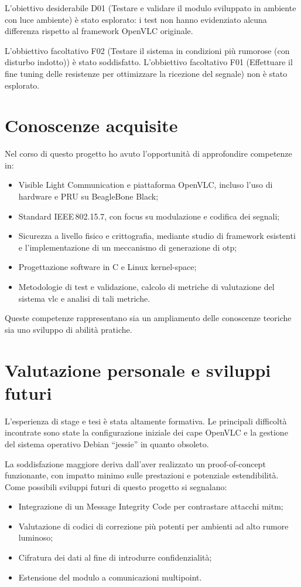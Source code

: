 L'obiettivo desiderabile D01 (Testare e validare il modulo sviluppato in ambiente con luce ambiente) è stato esplorato: i test non hanno evidenziato alcuna differenza rispetto al framework OpenVLC originale.

L'obbiettivo facoltativo F02 (Testare il sistema in condizioni più rumorose (con disturbo indotto)) è stato soddisfatto.
L'obbiettivo facoltativo F01 (Effettuare il fine tuning delle resistenze per ottimizzare la ricezione del segnale) non è stato esplorato.

\section{Conoscenze acquisite}
Nel corso di questo progetto ho avuto l'opportunità di approfondire competenze in:
\begin{itemize}
  \item Visible Light Communication e piattaforma OpenVLC, incluso l'uso di hardware e PRU su BeagleBone Black;
  \item Standard IEEE\,802.15.7, con focus su modulazione e codifica dei segnali;
  \item Sicurezza a livello fisico e crittografia, mediante studio di framework esistenti e l'implementazione di un meccanismo di generazione di \gls{otp};
  \item Progettazione software in C e Linux kernel-space;
  \item Metodologie di test e validazione, calcolo di metriche di valutazione del sistema \gls{vlc} e analisi di tali metriche.
\end{itemize}
Queste competenze rappresentano sia un ampliamento delle conoscenze teoriche sia uno sviluppo di abilità pratiche.

\section{Valutazione personale e sviluppi futuri}
L'esperienza di stage e tesi è stata altamente formativa. Le principali difficoltà incontrate sono state la configurazione iniziale dei cape OpenVLC e la gestione del sistema operativo Debian “jessie” in quanto obsoleto.

La soddisfazione maggiore deriva dall'aver realizzato un proof-of-concept funzionante, con impatto minimo sulle prestazioni e potenziale estendibilità. Come possibili sviluppi futuri di questo progetto si segnalano:
\begin{itemize}
  \item Integrazione di un Message Integrity Code per contrastare attacchi \gls{mitm};
  \item Valutazione di codici di correzione più potenti per ambienti ad alto rumore luminoso;
  \item Cifratura dei dati al fine di introdurre confidenzialità;
  \item Estensione del modulo a comunicazioni multipoint.
\end{itemize}